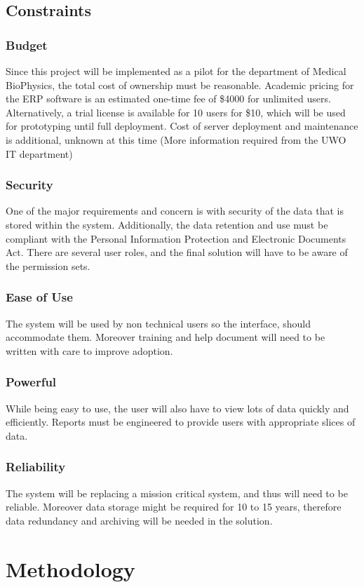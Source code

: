 \documentclass{journal}
\begin{document}
\subsection{ Constraints }
\subsubsection{ Budget }
Since this project will be implemented as a pilot for the department of Medical BioPhysics, the total cost of ownership must be reasonable. Academic pricing for the ERP software is an estimated one-time fee of \$4000 for unlimited users. Alternatively, a trial license is available for 10 users for \$10, which will be used for prototyping until full deployment. Cost of server deployment and maintenance is additional, unknown at this time (More information required from the UWO IT department)
\subsubsection{Security}
One of the major requirements and concern is with security of the data that is stored within the system. Additionally, the data retention and use must be compliant with the Personal Information Protection and Electronic Documents Act\cite{act}. There are several user roles, and the final solution will have to be aware of the permission sets. 
\subsubsection{ Ease of Use }
The system will be used by non technical users so the interface, should accommodate them. Moreover training and help document will need to be written with care to improve adoption. 
\subsubsection{ Powerful }
While being easy to use, the user will also have to view lots of data quickly and efficiently. Reports must be engineered to provide users with appropriate slices of data. 
\subsubsection{ Reliability }
The system will be replacing a mission critical system, and thus will need to be reliable. Moreover data storage might be required for 10 to 15 years, therefore data redundancy and archiving will be needed in the solution. 
\section{Methodology}
\end{document}
